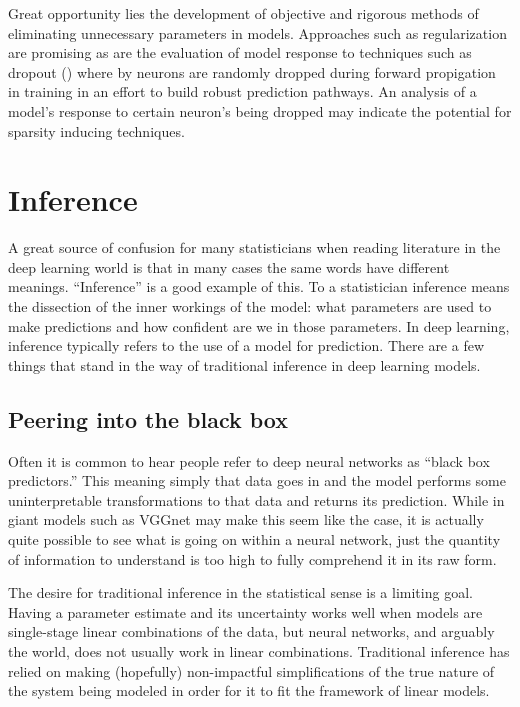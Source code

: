 \documentclass[]{book}
\theoremstyle{definition}
\theoremstyle{definition}
\theoremstyle{definition}
\theoremstyle{remark}
\begin{document}
Great opportunity lies the development of objective and rigorous methods
of eliminating unnecessary parameters in models. Approaches such as
regularization are promising as are the evaluation of model response to
techniques such as dropout (\citet{dropout}) where by neurons are
randomly dropped during forward propigation in training in an effort to
build robust prediction pathways. An analysis of a model's response to
certain neuron's being dropped may indicate the potential for sparsity
inducing techniques.

\section{Inference}\label{inference}

A great source of confusion for many statisticians when reading
literature in the deep learning world is that in many cases the same
words have different meanings. ``Inference'' is a good example of this.
To a statistician inference means the dissection of the inner workings
of the model: what parameters are used to make predictions and how
confident are we in those parameters. In deep learning, inference
typically refers to the use of a model for prediction. There are a few
things that stand in the way of traditional inference in deep learning
models.

\subsection{Peering into the black
box}\label{peering-into-the-black-box}

Often it is common to hear people refer to deep neural networks as
``black box predictors.'' This meaning simply that data goes in and the
model performs some uninterpretable transformations to that data and
returns its prediction. While in giant models such as VGGnet may make
this seem like the case, it is actually quite possible to see what is
going on within a neural network, just the quantity of information to
understand is too high to fully comprehend it in its raw form.

The desire for traditional inference in the statistical sense is a
limiting goal. Having a parameter estimate and its uncertainty works
well when models are single-stage linear combinations of the data, but
neural networks, and arguably the world, does not usually work in linear
combinations. Traditional inference has relied on making (hopefully)
non-impactful simplifications of the true nature of the system being
modeled in order for it to fit the framework of linear models.
\end{document}
